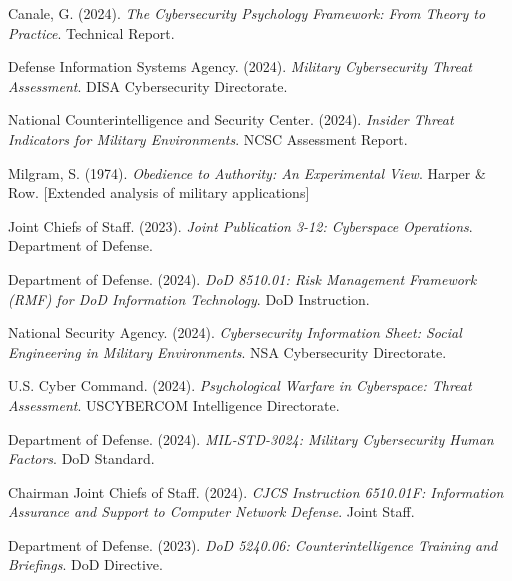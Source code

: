 \documentclass[10pt, twocolumn]{article}
\begin{document}
\begin{thebibliography}{99}

Canale, G. (2024). \textit{The Cybersecurity Psychology Framework: From Theory to Practice}. Technical Report.

Defense Information Systems Agency. (2024). \textit{Military Cybersecurity Threat Assessment}. DISA Cybersecurity Directorate.

National Counterintelligence and Security Center. (2024). \textit{Insider Threat Indicators for Military Environments}. NCSC Assessment Report.

Milgram, S. (1974). \textit{Obedience to Authority: An Experimental View}. Harper \& Row. [Extended analysis of military applications]

Joint Chiefs of Staff. (2023). \textit{Joint Publication 3-12: Cyberspace Operations}. Department of Defense.

Department of Defense. (2024). \textit{DoD 8510.01: Risk Management Framework (RMF) for DoD Information Technology}. DoD Instruction.

National Security Agency. (2024). \textit{Cybersecurity Information Sheet: Social Engineering in Military Environments}. NSA Cybersecurity Directorate.

U.S. Cyber Command. (2024). \textit{Psychological Warfare in Cyberspace: Threat Assessment}. USCYBERCOM Intelligence Directorate.

Department of Defense. (2024). \textit{MIL-STD-3024: Military Cybersecurity Human Factors}. DoD Standard.

Chairman Joint Chiefs of Staff. (2024). \textit{CJCS Instruction 6510.01F: Information Assurance and Support to Computer Network Defense}. Joint Staff.

Department of Defense. (2023). \textit{DoD 5240.06: Counterintelligence Training and Briefings}. DoD Directive.

\end{thebibliography}
\end{document}

